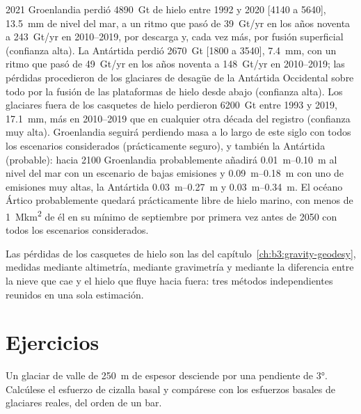 \begin{dated}{2021}
Groenlandia perdió \qty{4890}{Gt} de hielo entre 1992 y 2020 [4140 a 5640],
\qty{13.5}{mm} de nivel del mar, a un ritmo que pasó de \qty{39}{Gt/yr} en los
años noventa a \qty{243}{Gt/yr} en 2010--2019, por descarga y, cada vez más,
por fusión superficial (confianza alta). La Antártida perdió \qty{2670}{Gt}
[1800 a 3540], \qty{7.4}{mm}, con un ritmo que pasó de \qty{49}{Gt/yr} en los
años noventa a \qty{148}{Gt/yr} en 2010--2019; las pérdidas procedieron de los glaciares de desagüe de la Antártida Occidental
sobre todo por la fusión de las plataformas de hielo desde abajo (confianza
alta). Los glaciares fuera de los casquetes de hielo perdieron \qty{6200}{Gt} entre
1993 y 2019, \qty{17.1}{mm}, más en 2010--2019 que en cualquier otra década del
registro (confianza muy alta). Groenlandia seguirá perdiendo masa a lo largo de
este siglo con todos los escenarios considerados (prácticamente
seguro), y también la Antártida (probable): hacia 2100 Groenlandia probablemente añadirá
\qtyrange{0.01}{0.10}{m} al nivel del mar con un escenario de bajas emisiones
y \qtyrange{0.09}{0.18}{m} con uno de emisiones muy altas, la Antártida
\qtyrange{0.03}{0.27}{m} y \qtyrange{0.03}{0.34}{m}. El océano Ártico
probablemente quedará prácticamente libre de hielo marino, con menos de
\qty{1}{\mega km^2} de él en su mínimo de septiembre por primera vez
antes de 2050 con todos los escenarios considerados.
\end{dated}

Las pérdidas de los casquetes de hielo son las del capítulo~\ref{ch:b3:gravity-geodesy},
medidas mediante altimetría, mediante gravimetría y mediante la diferencia entre la nieve
que cae y el hielo que fluye hacia fuera: tres métodos independientes
reunidos en una sola estimación.

\section{Ejercicios}

\begin{exercise}[$\star$]\label{exo:b3:glaciology:1}
Un glaciar de valle de \qty{250}{m} de espesor desciende por una pendiente de \ang{3}. Calcúlese
el esfuerzo de cizalla basal y compárese con los esfuerzos basales de glaciares
reales, del orden de un bar.
\end{exercise}

